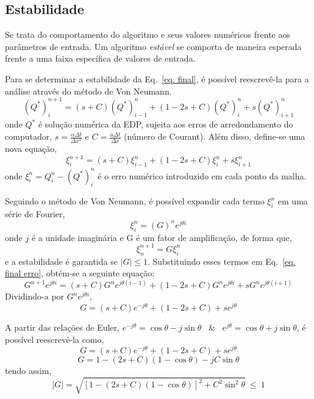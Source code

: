 \subsection{Estabilidade}
Se trata do comportamento do algoritmo e seus valores numéricos frente aos
parâmetros de entrada. Um algoritmo \emph{estável} se comporta de maneira
esperada frente a uma faixa específica de valores de entrada.

Para se determinar a estabilidade da Eq.\ \ref{eq. final}, é possível
reescrevê-la para a análise através do método de Von Neumann.
\begin{equation}
    (Q^*)_i^{n+1} = (s + C)(Q^*)_{i-1}^n + (1 - 2s + C)(Q^*)_i^n +
    s(Q^*)_{i+1}^n
\end{equation}
onde $Q^*$ é solução numérica da EDP, sujeita aos erros de arredondamento do
computador, $s = \frac{\alpha\Delta t}{\Delta x^2}$ e $C = \frac{\bar{u}\Delta
t}{\Delta x}$ (número de Courant). Além disso, define-se uma nova equação,
\begin{equation}\label{eq. final erro}
    \xi_i^{n+1} = (s + C)\xi_{i-1}^n + (1 - 2s + C)\xi_i^n + s\xi_{i+1}^n
\end{equation}
onde $\xi_i^n = Q_i^n - (Q^*)_i^n$ é o erro numérico introduzido em cada ponto
da malha.

Seguindo o método de Von Neumann, é possível expandir cada termo $\xi_i^n$ em
uma série de Fourier,
\begin{equation}
    \xi_i^n = (G)^n e^{j \theta i}
\end{equation}
onde $j$ é a unidade imaginária e G é um fator de amplificação, de forma que,
\begin{equation}
    \xi_n^{n+1} = G\xi_i^n
\end{equation}
e a estabilidade é garantida se $|G| \leq 1$. Substituindo esses termos em Eq.\
\ref{eq. final erro}, obtém-se a seguinte equação:
\begin{equation}
    G^{n+1}e^{j \theta i} =
      (s + C)G^n e^{j \theta (i-1)}
      + (1 - 2s + C)G^n e^{j \theta i}
      + s G^n e^{j \theta (i+1)}
\end{equation}
Dividindo-a por $G^n e^{j \theta i}$,
\[
    G = (s + C)e^{-j \theta} + (1 - 2s + C) + se^{j \theta}
\]

A partir das relações de Euler, $e^{-j \theta} = \cos\theta - j\sin\theta$ \ \&
\ $e^{j\theta} = \cos\theta + j\sin\theta$, é possível reescrevê-la como,
\[
    G = (s + C)e^{-j \theta} + (1 - 2s + C) + se^{j \theta}
\]
\[
    G = 1 - (2s + C)(1 - \cos\theta) - jC\sin\theta
\]
tendo assim,
\begin{equation}
    |G| = \sqrt{[1 - (2s + C)(1-\cos\theta)]^2 + C^2\sin^2\theta}\ \leq\ 1
\end{equation}

